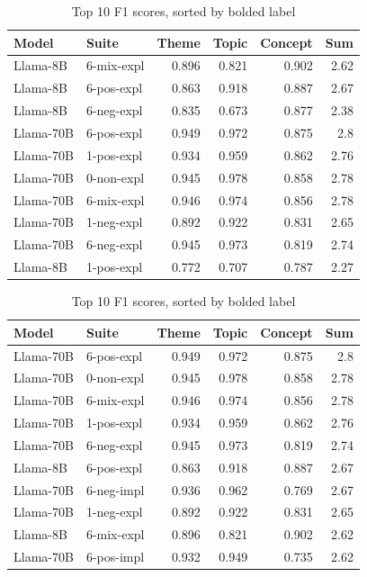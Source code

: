 \begin{table}
\begin{tabular}{ll|rrrr}
\toprule
Model & Suite & Theme & Topic & \bfseries Concept & Sum \\
\midrule
Llama-8B & 6-mix-expl & 0.896 & 0.821 & 0.902 & 2.62 \\
Llama-8B & 6-pos-expl & 0.863 & 0.918 & 0.887 & 2.67 \\
Llama-8B & 6-neg-expl & 0.835 & 0.673 & 0.877 & 2.38 \\
Llama-70B & 6-pos-expl & 0.949 & 0.972 & 0.875 & 2.8 \\
Llama-70B & 1-pos-expl & 0.934 & 0.959 & 0.862 & 2.76 \\
Llama-70B & 0-non-expl & 0.945 & 0.978 & 0.858 & 2.78 \\
Llama-70B & 6-mix-expl & 0.946 & 0.974 & 0.856 & 2.78 \\
Llama-70B & 1-neg-expl & 0.892 & 0.922 & 0.831 & 2.65 \\
Llama-70B & 6-neg-expl & 0.945 & 0.973 & 0.819 & 2.74 \\
Llama-8B & 1-pos-expl & 0.772 & 0.707 & 0.787 & 2.27 \\
\bottomrule
\end{tabular}

\begin{tabular}{ll|rrrr}
\toprule
Model & Suite & Theme & Topic & Concept & \bfseries Sum \\
\midrule
Llama-70B & 6-pos-expl & 0.949 & 0.972 & 0.875 & 2.8 \\
Llama-70B & 0-non-expl & 0.945 & 0.978 & 0.858 & 2.78 \\
Llama-70B & 6-mix-expl & 0.946 & 0.974 & 0.856 & 2.78 \\
Llama-70B & 1-pos-expl & 0.934 & 0.959 & 0.862 & 2.76 \\
Llama-70B & 6-neg-expl & 0.945 & 0.973 & 0.819 & 2.74 \\
Llama-8B & 6-pos-expl & 0.863 & 0.918 & 0.887 & 2.67 \\
Llama-70B & 6-neg-impl & 0.936 & 0.962 & 0.769 & 2.67 \\
Llama-70B & 1-neg-expl & 0.892 & 0.922 & 0.831 & 2.65 \\
Llama-8B & 6-mix-expl & 0.896 & 0.821 & 0.902 & 2.62 \\
Llama-70B & 6-pos-impl & 0.932 & 0.949 & 0.735 & 2.62 \\
\bottomrule
\end{tabular}

    
    \caption{Top 10 F1 scores, sorted by bolded label}
    \label{tab:top10s}
\end{table}